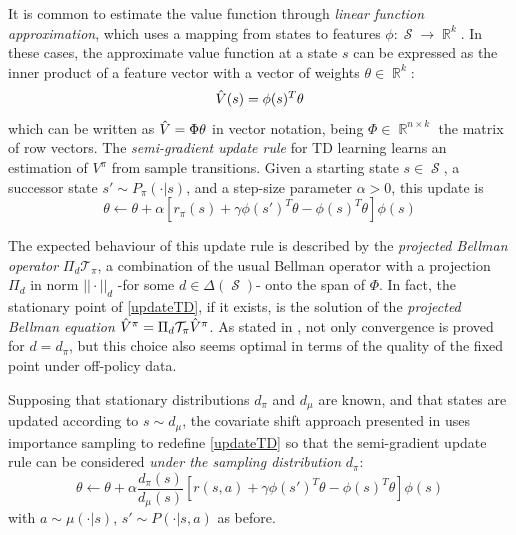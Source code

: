 \documentclass[12pt,a4paper,openright,twoside]{article}
\DeclareMathOperator*{\R}{\mathbb{R}}
\DeclareMathOperator*{\Sspace}{\mathcal{S}}
\numberwithin{equation}{section}
\theoremstyle{definition}
\theoremstyle{remark}
\theoremstyle{plain}
\begin{document}
It is common to estimate the value function through \textit{linear function approximation}, which uses a mapping from states to features $\phi: \Sspace \rightarrow \R^k$. In these cases, the approximate value function at a state $s$ can be expressed as the inner product of a feature vector with a vector of weights $\theta \in \R^k$:
\begin{equation} \label{linearApproxSV}
    \Hat{V}(s) = \phi(s)^T \theta
\end{equation}
which can be written as $\Hat{V} = \Phi \theta$ in vector notation, being $\Phi \in \R^{n\times k}$ the matrix of row vectors. The \textit{semi-gradient update rule} for TD learning\cite{TD} learns an estimation of $V^\pi$ from sample transitions. Given a starting state $s\in\Sspace$, a successor state $s'\sim P_\pi(\cdot | s)$, and a step-size parameter $\alpha > 0$, this update is
\begin{equation} \label{updateTD}
    \theta \leftarrow \theta + \alpha \left[ r_\pi(s) + \gamma\phi(s')^T \theta - \phi(s)^T \theta \right] \phi(s)
\end{equation}

The expected behaviour of this update rule is described by the \textit{projected Bellman operator} $\Pi_d \mathcal{T}_\pi$, a combination of the usual Bellman operator with a projection $\Pi_d$ in norm $||\cdot||_d$ -for some $d\in\Delta(\Sspace)$- onto the span of $\Phi$\cite{projectedBellman}. In fact, the stationary point of \ref{updateTD}, if it exists, is the solution of the \textit{projected Bellman equation} $\Hat{V}^\pi = \Pi_d \mathcal{T}_\pi \Hat{V}^\pi$. As stated in \cite{DCOPTD}, not only convergence is proved for $d=d_\pi$, but this choice also seems optimal in terms of the quality of the fixed point under off-policy data.

Supposing that stationary distributions $d_\pi$ and $d_\mu$ are known, and that states are updated according to $s\sim d_\mu$, the covariate shift approach presented in \cite{COPTD} uses importance sampling to redefine \ref{updateTD} so that the semi-gradient update rule can be considered \textit{under the sampling distribution} $d_\pi$:
\begin{equation} \label{updateTDimportance}
    \theta \leftarrow \theta + \alpha \frac{d_\pi(s)}{d_\mu (s)}\left[ r(s,a) + \gamma\phi(s')^T \theta - \phi(s)^T \theta \right] \phi(s)
\end{equation}
with $a\sim \mu(\cdot|s)$, $s' \sim P(\cdot|s,a)$ as before. 
\end{document}
